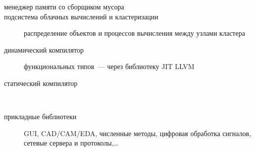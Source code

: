 \begin{description}
  \item[менеджер памяти со сборщиком мусора]
  \item[подсистема облачных вычислений и кластеризации] распределение объектов и
  процессов вычисления между узлами кластера 
  \item[динамический компилятор] функциональных типов\ --- через библиотеку JIT
  LLVM
  \item[статический компилятор] \ \\
  \item[прикладные библиотеки] GUI, CAD/CAM/EDA, численные методы, цифровая
  обработка сигналов, сетевые сервера и протоколы,\ldots
\end{description}


